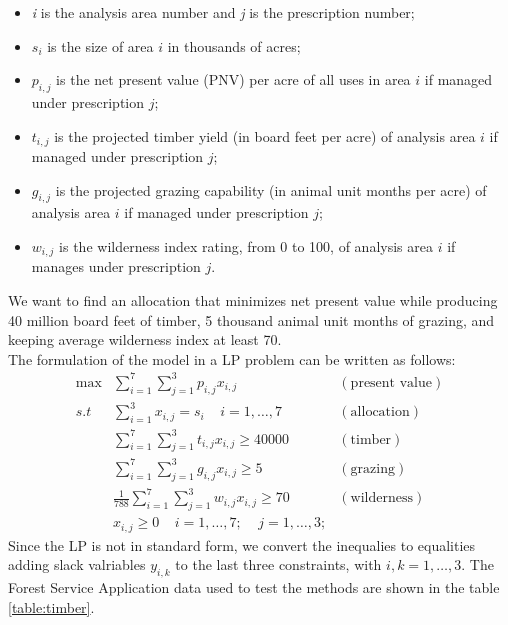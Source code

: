 \documentclass[a4paper,10 pt,titlepage,twoside]{book}
\theoremstyle{plain}
\theoremstyle{definition}
\theoremstyle{remark}
\begin{document}
\begin{itemize}
	\item \textit{i} is the analysis area number and \textit{j} is the prescription number;
	\item $s_{i}$ is the size of area $i$ in thousands of acres;
	\item $p_{i,j}$ is the net present value (PNV) per acre of all uses in area $i$ if managed under prescription $j$;
	\item $t_{i,j}$ is the projected timber yield (in board feet per acre) of analysis area $i$ if managed under prescription $j$;
	\item $g_{i,j}$ is the projected grazing capability (in animal unit months per acre) of analysis area $i$ if managed under prescription $j$;
	\item $w_{i,j}$ is the wilderness index rating, from 0 to 100, of analysis area $i$ if manages under prescription $j$.
\end{itemize}
We want to find an allocation that minimizes net present value while producing 40 million board feet of timber, 5 thousand animal unit months of grazing, and keeping average wilderness index at least 70.\\
The formulation of the model in a LP problem can be written as follows:
\begin{align*}
\max&\sum_{i=1}^{7}\sum_{j=1}^{3} p_{i,j}x_{i,j}&(\text{present value})\\
s.t\;\; & \sum_{i=1}^{3}x_{i,j}=s_{i}\;\;\;\;i = 1, \dots,7&(\text{allocation})\\
&\sum_{i=1}^{7}\sum_{j=1}^{3} t_{i,j}x_{i,j}\geq 40000&(\text{timber})\\
&\sum_{i=1}^{7}\sum_{j=1}^{3} g_{i,j}x_{i,j}\geq5&(\text{grazing})\\
&\frac{1}{788}\sum_{i=1}^{7}\sum_{j=1}^{3} w_{i,j}x_{i,j}\geq 70&(\text{wilderness})\\
&x_{i,j}\geq 0 \;\;\;\;i = 1,\dots,7;\;\;\;\;j = 1,\dots,3;
\end{align*}
Since the LP is not in standard form, we convert the inequalies to equalities adding slack valriables $y_{i,k}$ to the last three constraints, with $i, k = 1, \dots, 3$. The Forest Service Application data used to test the methods are shown in the table \ref{table:timber}.
\end{document}
